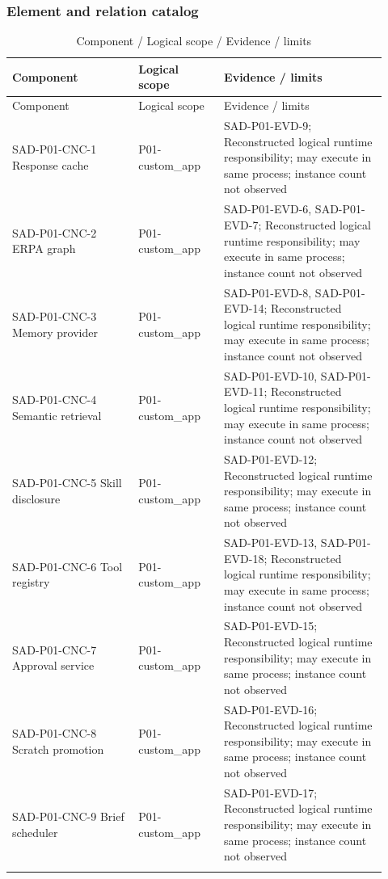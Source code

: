 \documentclass[10pt,letterpaper]{article}
\begin{document}
\subsubsection{Element and relation catalog}
\begin{longtable}{@{}>{\raggedright\arraybackslash}p{0.31\linewidth}>{\raggedright\arraybackslash}p{0.21\linewidth}>{\raggedright\arraybackslash}p{0.4\linewidth}@{}}
\caption{Component / Logical scope / Evidence / limits}\\
\toprule Component & Logical scope & Evidence / limits\\\midrule\endfirsthead
\toprule Component & Logical scope & Evidence / limits\\\midrule\endhead
SAD-P01-CNC-1 Response cache & P01-custom\_app & SAD-P01-EVD-9; Reconstructed logical runtime responsibility; may execute in same process; instance count not observed\\\addlinespace
SAD-P01-CNC-2 ERPA graph & P01-custom\_app & SAD-P01-EVD-6, SAD-P01-EVD-7; Reconstructed logical runtime responsibility; may execute in same process; instance count not observed\\\addlinespace
SAD-P01-CNC-3 Memory provider & P01-custom\_app & SAD-P01-EVD-8, SAD-P01-EVD-14; Reconstructed logical runtime responsibility; may execute in same process; instance count not observed\\\addlinespace
SAD-P01-CNC-4 Semantic retrieval & P01-custom\_app & SAD-P01-EVD-10, SAD-P01-EVD-11; Reconstructed logical runtime responsibility; may execute in same process; instance count not observed\\\addlinespace
SAD-P01-CNC-5 Skill disclosure & P01-custom\_app & SAD-P01-EVD-12; Reconstructed logical runtime responsibility; may execute in same process; instance count not observed\\\addlinespace
SAD-P01-CNC-6 Tool registry & P01-custom\_app & SAD-P01-EVD-13, SAD-P01-EVD-18; Reconstructed logical runtime responsibility; may execute in same process; instance count not observed\\\addlinespace
SAD-P01-CNC-7 Approval service & P01-custom\_app & SAD-P01-EVD-15; Reconstructed logical runtime responsibility; may execute in same process; instance count not observed\\\addlinespace
SAD-P01-CNC-8 Scratch promotion & P01-custom\_app & SAD-P01-EVD-16; Reconstructed logical runtime responsibility; may execute in same process; instance count not observed\\\addlinespace
SAD-P01-CNC-9 Brief scheduler & P01-custom\_app & SAD-P01-EVD-17; Reconstructed logical runtime responsibility; may execute in same process; instance count not observed\\\addlinespace

\end{longtable}
\end{document}
